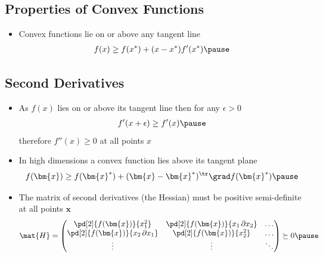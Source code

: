 
\begin{slide}
\section[-2]{Properties of Convex Functions}

\pb
\begin{itemize}
\item Convex functions lie on or above any tangent line
  \begin{align*}
    f(x) \geq f(x^*) + (x-x^*) f'(x^*)\pause
  \end{align*}
  \begin{center}
    \pauseb
  \end{center}
\end{itemize}

\end{slide}


\begin{slide}
\section[-2]{Second Derivatives}

\begin{PauseHighLight}
  \begin{itemize}
  \item As $f(x)$ lies on or above its tangent line then for any $\epsilon>0$
    \begin{align*}
      f'(x+\epsilon)\geq f'(x)\pause
    \end{align*}
    therefore $f''(x)\geq 0$ at all points $x$\pause
  \item In high dimensions a convex function lies above its tangent plane
    \begin{align*}
      f(\bm{x}) \geq f(\bm{x}^*) + (\bm{x}-\bm{x}^*)^\tr \grad f(\bm{x}^*)\pause
    \end{align*}
  \item The matrix of second derivatives (the Hessian) must be
    positive semi-definite at all points $\bm{x}$
    {\small \begin{align*}
      \mat{H} =
      \begin{pmatrix}
        \pd[2]{f(\bm{x})}{x_1^2} & \pd[2]{f(\bm{x})}{x_1\, \partial
          x_2} & \ldots \\
        \pd[2]{f(\bm{x})}{x_2 \, \partial x_1} &
        \pd[2]{f(\bm{x})}{x_2^2} & \ldots\\
        \vdots & \vdots & \ddots
      \end{pmatrix} \succeq 0\pause
    \end{align*} }
  \end{itemize}
\end{PauseHighLight}

\end{slide}

